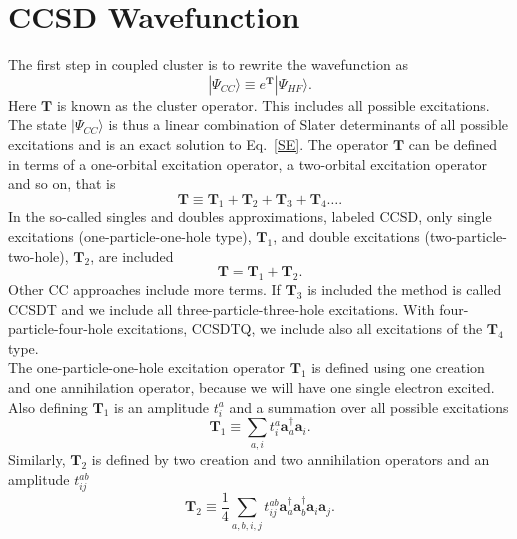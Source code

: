 \documentclass[a4paper,norsk,11pt,twoside]{report}
\begin{document}
\section{CCSD Wavefunction}
The first step in coupled cluster is to rewrite the wavefunction as
\begin{equation}
|\Psi_{CC} \rangle \equiv e^{\textbf{T}} | \Psi_{HF} \rangle .
\end{equation} 
Here $\textbf{T}$ is known as the cluster operator. This includes all
possible excitations. The state $|\Psi_{CC} \rangle$ is thus a linear
combination of Slater determinants of all possible excitations and is
an exact solution to Eq.~\eqref{SE}. The operator $\textbf{T}$ can be defined in
terms of a one-orbital excitation operator, a two-orbital excitation
operator and so on, that is
\begin{equation}
\textbf{T} \equiv \textbf{T}_1 + \textbf{T}_2 + \textbf{T}_3 + \textbf{T}_4 \dots .
\end{equation}
In the so-called singles and doubles approximations, labeled CCSD,
only single excitations (one-particle-one-hole type), $\textbf{T}_1$,
and double excitations (two-particle-two-hole), $\textbf{T}_2$, are
included
\begin{equation}
\textbf{T} = \textbf{T}_1 + \textbf{T}_2 .
\end{equation}
Other CC approaches include more terms. If $\textbf{T}_3$ is included the method is called CCSDT and we include all three-particle-three-hole excitations. With four-particle-four-hole excitations, CCSDTQ,  we include also all excitations of the $\textbf{T}_4$ type. \\
The one-particle-one-hole excitation operator 
$\textbf{T}_1$ is defined using one creation and one annihilation operator, because we will have one single electron excited. Also defining $\textbf{T}_1$ is an amplitude $t_i^a$ and a summation over all possible excitations
\begin{equation}
\textbf{T}_1 \equiv \sum_{a,i} t_i^a \textbf{a}^{\dag}_a \textbf{a}_i . \label{t1defi}
\end{equation}
Similarly, $\textbf{T}_2$ is defined by two creation and two annihilation operators and an amplitude $t_{ij}^{ab}$
\begin{equation}
\textbf{T}_2 \equiv \frac{1}{4} \sum_{a,b,i,j} t_{ij}^{ab} \textbf{a}^{\dag}_a \textbf{a}^{\dag}_b \textbf{a}_i \textbf{a}_j . \label{t2defi}
\end{equation}
\end{document}
